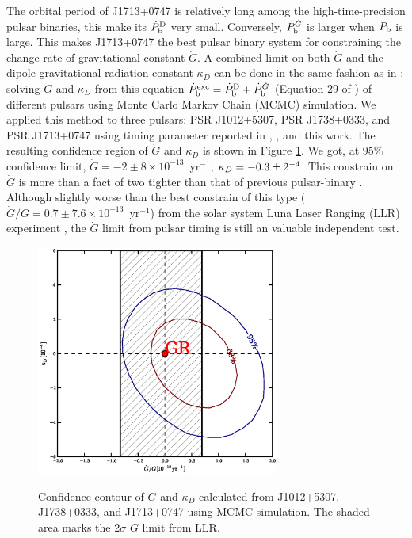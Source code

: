 The orbital period of J1713+0747 is relatively long among the
high-time-precision pulsar binaries, this make its $\dot{P}_{\rm b}^{\rm D}$
very small. Conversely, $\dot{P}_{\rm b}^{\dot{G}}$ is larger when $P_{\rm b}$
is large. This makes J1713+0747 the best pulsar binary system for constraining
the change rate of gravitational constant $\dot{G}$. A combined limit on both
$\dot{G}$ and the dipole gravitational radiation constant $\kappa_D$ can be
done in the same fashion as in \citet{lwj+09}: solving $\dot{G}$ and $\kappa_D$
from this equation $\dot{P}_{\rm b}^{\rm exc} = \dot{P}_{\rm b}^{\rm D} +
\dot{P}_{\rm b}^{\dot{G}}$ (Equation 29 of \citealt{lwj+09}) of different
pulsars using Monte Carlo Markov Chain (MCMC) simulation. We applied this method to three pulsars: PSR J1012+5307, PSR
J1738+0333, and PSR J1713+0747 using timing parameter reported in
\citet{lwj+09}, \citet{fwe+12}, and this work.
The resulting confidence region of $\dot{G}$ and $\kappa_D$ is shown in Figure
\ref{fig:Gdot}.
We got, at 95\% confidence limit, $\dot{G} = -2\pm8\times10^{-13}$~yr$^{-1}$;
$\kappa_D=-0.3\pm2\time10^{-4}$. 
This constrain on $\dot{G}$ is more than a fact of two tighter than that of
previous pulsar-binary \citep{fwe+12}. 
Although slightly worse than
the best constrain of this type ($\dot{G}/G=0.7\pm7.6\times10^{-13}$~yr$^{-1}$) from the solar system Luna Laser Ranging (LLR)
experiment \citep{hmb10}, the $\dot{G}$ limit from pulsar timing is still an valuable independent test.  

\begin{figure}
\includegraphics[width=8cm]{GdotContour.ps} \\ 
\caption {\label{fig:Gdot} Confidence contour of $\dot{G}$ and $\kappa_D$
calculated from J1012+5307, J1738+0333, and J1713+0747 using MCMC simulation.
The shaded area marks the 2$\sigma$ $\dot{G}$ limit from LLR. 
} 
\end{figure} 


